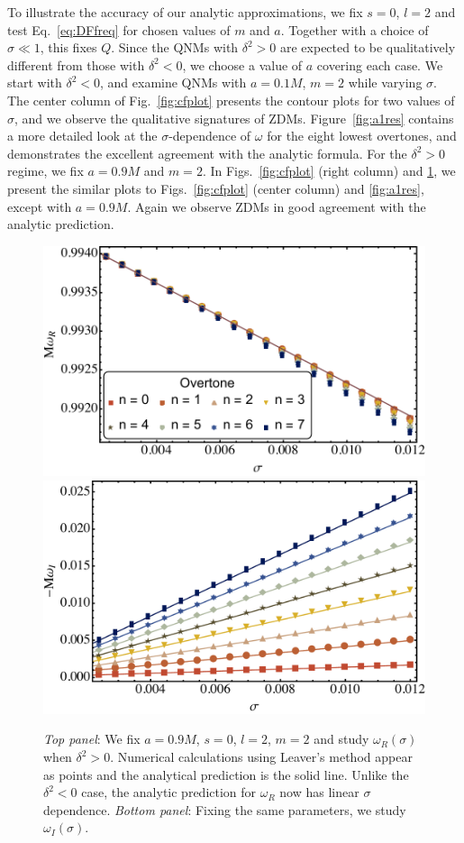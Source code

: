 \begin{refsection}
To illustrate the accuracy of our analytic approximations, we fix $s = 0$, $l = 2$ and test Eq.~\eqref{eq:DFfreq} for chosen values of $m$ and $a$. Together with a choice of $\sigma \ll1  $, this fixes $Q$.
Since the QNMs with $\delta^2>0$ are expected to be qualitatively different from those with $\delta^2<0$, we choose a value of $a$ covering each case.
We start with $\delta^2<0$, and examine QNMs with $a = 0.1 M$, $m =2$  while varying $\sigma$. The center column of Fig.~\ref{fig:cfplot} presents the contour plots for two values of $\sigma$, and we observe the qualitative signatures of ZDMs. 
Figure~\ref{fig:a1res} contains a more detailed look at the $\sigma$-dependence of $\omega$ for the eight lowest overtones, and demonstrates the excellent agreement with the analytic formula. 
For the $\delta^2>0$ regime, we fix $a = 0.9 M$ and $m =2$. In Figs.~\ref{fig:cfplot} (right column) and \ref{fig:a9res}, we present the similar plots to Figs.~\ref{fig:cfplot} (center column) and \ref{fig:a1res}, except with $a=0.9M$. Again we observe ZDMs in good agreement with the analytic prediction.


\begin{figure}[tb]
\includegraphics[width =.95 \columnwidth]{chapter_extremal/etc/a9resRe.pdf}
\includegraphics[width =.95 \columnwidth]{chapter_extremal/etc/a9resIm.pdf}
\caption{{\it Top panel}: We fix $a = 0.9 M$, $s=0 $, $l=2$, $m =2$ and study $\omega_R(\sigma)$ when $\delta^2 > 0$. Numerical calculations using Leaver's method appear as points and the analytical prediction is the solid line. Unlike the $\delta^2<0$ case, the analytic prediction for $\omega_R$ now has linear $\sigma$ dependence. {\it Bottom panel}: Fixing the same parameters, we study $\omega_I(\sigma)$.}
\label{fig:a9res}
\end{figure}



\end{refsection}
